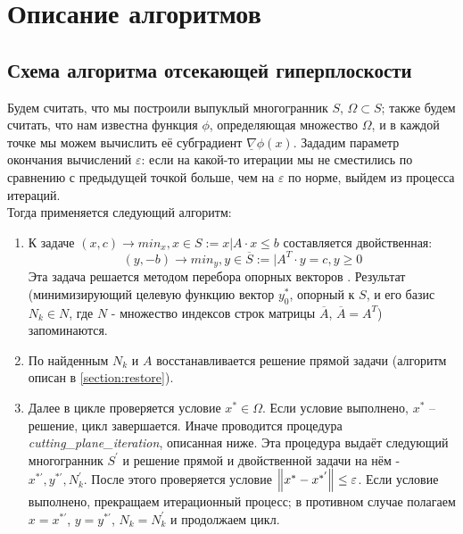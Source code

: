 \documentclass[main.tex]{subfiles}
\begin{document}
\newpage
\section{Описание алгоритмов}
\subsection{Схема алгоритма отсекающей гиперплоскости}
Будем считать, что мы построили выпуклый многогранник $S$, $\varOmega \subset S$; также будем считать, что нам известна функция $\phi$, определяющая множество $\varOmega$, и в каждой точке мы можем вычислить её субградиент $\underline{\nabla}\phi(x)$. Зададим параметр окончания вычислений $\varepsilon$: если на какой-то итерации мы не сместились  по сравнению с предыдущей точкой больше, чем на $\varepsilon$ по норме, выйдем из процесса итераций.\\
Тогда применяется следующий алгоритм:
\begin{enumerate}
	\item К задаче $(x,c) \rightarrow min_x, x \in S:={x|A\cdot x\le b}$ составляется двойственная: 
	$$(y,-b) \rightarrow min_y, y \in \overline{S}:={|A^T\cdot y = c, y \ge 0}$$
	Эта задача решается методом перебора опорных векторов \cite{petuh}. Результат (минимизирующий целевую функцию вектор $y^*_0$, опорный к $S$, и его базис $N_k \in N$, где $N$ - множество индексов строк матрицы $\overline{A}$, $\overline{A} = A^T$) запоминаются. 
	\item По найденным $N_k$ и $A$ восстанавливается решение прямой задачи (алгоритм описан в \ref{section:restore}).
	\item Далее в цикле проверяется условие $x^* \in \varOmega$. Если условие выполнено, $x^*$ -- решение, цикл завершается. Иначе проводится процедура \emph{cutting\_plane\_iteration}, описанная ниже. Эта процедура выдаёт следующий многогранник $S^{'}$ и решение прямой и двойственной задачи на нём - $x^{*'}, y^{*'}, N_k^{'}$. После этого проверяется условие $\left\lVert x^*-x^{*'}\right\rVert \le \varepsilon$. Если условие выполнено, прекращаем итерационный процесс; в противном случае полагаем $x=x^{*'}$, $y=y^{*'}$, $N_k=N_k^{'}$ и продолжаем цикл.
\end{enumerate}
\end{document}
